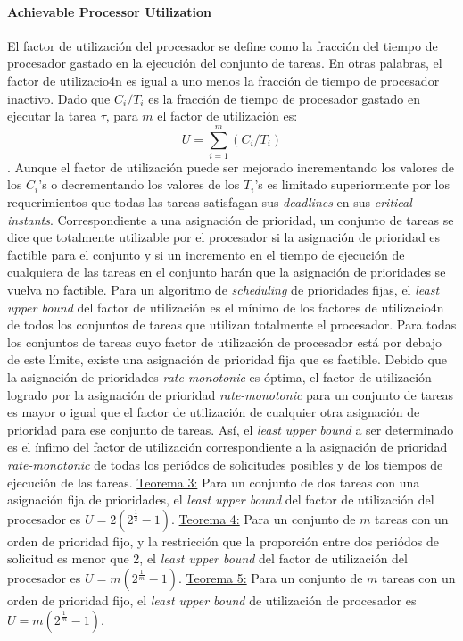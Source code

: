 \paragraph{\textnormal{\textbf{Achievable Processor Utilization}}}
El factor de utilización del procesador se define como la fracción del tiempo de procesador gastado en la ejecución del conjunto de tareas. En otras palabras, el factor de utilizacio4n es igual a uno menos la fracción de tiempo de procesador inactivo. Dado que $C_i/T_i$ es la fracción de tiempo de procesador gastado en ejecutar la tarea $\tau$, para $m$ el factor de utilización es: $$U = \sum_{i = 1}^{m} (C_i/T_i)$$. Aunque el factor de utilización puede ser mejorado incrementando los valores de los $C_i$'s o decrementando los valores de los $T_i$'s es limitado superiormente por los requerimientos que todas las tareas satisfagan sus \emph{deadlines} en sus \emph{critical instants}. Correspondiente a una asignación de prioridad, un conjunto de tareas se dice que totalmente utilizable por el procesador si la asignación de prioridad es factible para el conjunto y si un incremento en el tiempo de ejecución de cualquiera de las tareas en el conjunto harán que la asignación de prioridades se vuelva no factible. Para un algoritmo de \emph{scheduling} de prioridades fijas, el \emph{least upper bound} del factor de utilización es el mínimo de los factores de utilizacio4n de todos los conjuntos de tareas que utilizan totalmente el procesador. Para todas los conjuntos de tareas cuyo factor de utilización de procesador está por debajo de este límite, existe una asignación de prioridad fija que es factible. Debido que la asignación de prioridades \emph{rate monotonic} es óptima, el factor de utilización logrado por la asignación de prioridad \emph{rate-monotonic} para un conjunto de tareas es mayor o igual que el factor de utilización de cualquier otra asignación de prioridad para ese conjunto de tareas. Así, el \emph{least upper bound} a ser determinado es el ínfimo del factor de utilización correspondiente a la asignación de prioridad \emph{rate-monotonic} de todas los periódos de solicitudes posibles y de los tiempos de ejecución de las tareas. \underline{Teorema 3:} Para un conjunto de dos tareas con una asignación fija de prioridades, el \emph{least upper bound} del factor de utilización del procesador es $U = 2(2^{\frac{1}{2}} - 1)$. \underline{Teorema 4:} Para un conjunto de $m$ tareas con un orden de prioridad fijo, y la restricción que la proporción entre dos periódos de solicitud es menor que 2, el \emph{least upper bound} del factor de utilización del procesador es $U = m(2^{\frac{1}{m}} - 1)$. \underline{Teorema 5:} Para un conjunto de $m$ tareas con un orden de prioridad fijo, el \emph{least upper bound} de utilización de procesador es $U = m(2^{\frac{1}{m}} - 1)$.


